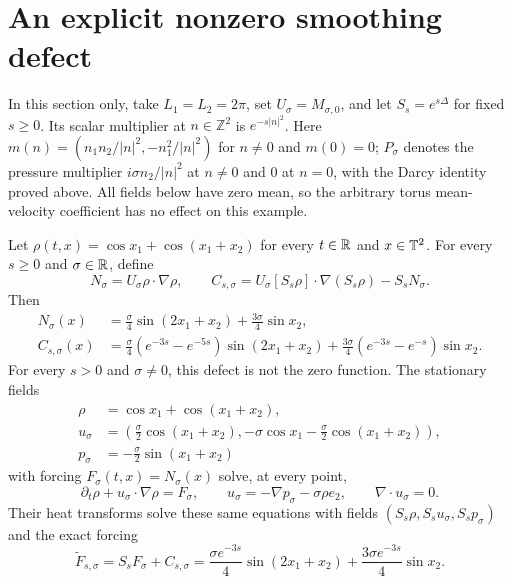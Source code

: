 \section{An explicit nonzero smoothing defect}
In this section only, take $L_1=L_2=2\pi$, set
$U_\sigma=M_{\sigma,0}$, and let $S_s=e^{s\Delta}$ for fixed $s\ge0$.
Its scalar multiplier at $n\in\mathbb Z^2$ is $e^{-s|n|^2}$.
Here $m(n)=(n_1n_2/|n|^2,-n_1^2/|n|^2)$ for $n\ne0$ and $m(0)=0$;
$P_\sigma$ denotes the pressure multiplier $i\sigma n_2/|n|^2$ at
$n\ne0$ and $0$ at $n=0$, with the Darcy identity proved above.
All fields below have zero mean, so the arbitrary torus mean-velocity
coefficient has no effect on this example.
\begin{proposition}
Let \(\rho(t,x)=\cos x_1+\cos(x_1+x_2)\) for every \(t\in\mathbb R\) and
\(x\in\mathbb T^2\). For every \(s\geq0\) and \(\sigma\in\mathbb R\), define
\[
 N_\sigma=U_\sigma\rho\cdot\nabla\rho,\qquad
 C_{s,\sigma}=U_\sigma[S_s\rho]\cdot\nabla(S_s\rho)-S_sN_\sigma.
\]
Then
\begin{align}
 N_\sigma(x)
 &=\frac{\sigma}{4}\sin(2x_1+x_2)
                       +\frac{3\sigma}{4}\sin x_2,\label{ipmc:example-N}\\
 C_{s,\sigma}(x)
 &=\frac{\sigma}{4}(e^{-3s}-e^{-5s})\sin(2x_1+x_2)
       +\frac{3\sigma}{4}(e^{-3s}-e^{-s})\sin x_2.\label{ipmc:example-C}
\end{align}
For every \(s>0\) and \(\sigma\ne0\), this defect is not the zero
function. The stationary fields
\begin{align*}
 \rho&=\cos x_1+\cos(x_1+x_2),\\
 u_\sigma&=\left(\frac{\sigma}{2}\cos(x_1+x_2),
               -\sigma\cos x_1-\frac{\sigma}{2}\cos(x_1+x_2)\right),\\
 p_\sigma&=-\frac{\sigma}{2}\sin(x_1+x_2)
\end{align*}
with forcing \(F_\sigma(t,x)=N_\sigma(x)\) solve, at every point,
\[
 \partial_t\rho+u_\sigma\cdot\nabla\rho=F_\sigma,
 \qquad u_\sigma=-\nabla p_\sigma-\sigma\rho e_2,
 \qquad\nabla\cdot u_\sigma=0.
\]
Their heat transforms solve these same equations with fields
\((S_s\rho,S_su_\sigma,S_sp_\sigma)\) and the exact forcing
\[
 \widetilde F_{s,\sigma}=S_sF_\sigma+C_{s,\sigma}
   =\frac{\sigma e^{-3s}}4\sin(2x_1+x_2)
                 +\frac{3\sigma e^{-3s}}4\sin x_2.
\]
\end{proposition}

